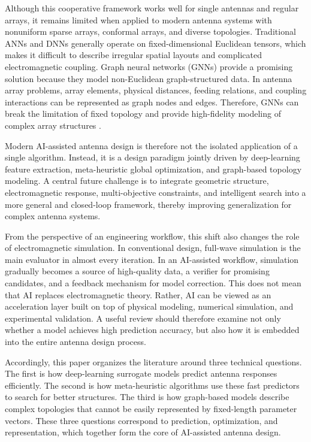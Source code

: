 \documentclass{article}
\begin{document}
Although this cooperative framework works well for single antennas and regular arrays, it remains limited when applied to modern antenna systems with nonuniform sparse arrays, conformal arrays, and diverse topologies. Traditional ANNs and DNNs generally operate on fixed-dimensional Euclidean tensors, which makes it difficult to describe irregular spatial layouts and complicated electromagnetic coupling. Graph neural networks (GNNs) provide a promising solution because they model non-Euclidean graph-structured data. In antenna array problems, array elements, physical distances, feeding relations, and coupling interactions can be represented as graph nodes and edges. Therefore, GNNs can break the limitation of fixed topology and provide high-fidelity modeling of complex array structures \cite{yang2024doa,wu2021gnn,yu2018stgcn,he2025fluid,xie2025pinching}.

Modern AI-assisted antenna design is therefore not the isolated application of a single algorithm. Instead, it is a design paradigm jointly driven by deep-learning feature extraction, meta-heuristic global optimization, and graph-based topology modeling. A central future challenge is to integrate geometric structure, electromagnetic response, multi-objective constraints, and intelligent search into a more general and closed-loop framework, thereby improving generalization for complex antenna systems.

From the perspective of an engineering workflow, this shift also changes the role of electromagnetic simulation. In conventional design, full-wave simulation is the main evaluator in almost every iteration. In an AI-assisted workflow, simulation gradually becomes a source of high-quality data, a verifier for promising candidates, and a feedback mechanism for model correction. This does not mean that AI replaces electromagnetic theory. Rather, AI can be viewed as an acceleration layer built on top of physical modeling, numerical simulation, and experimental validation. A useful review should therefore examine not only whether a model achieves high prediction accuracy, but also how it is embedded into the entire antenna design process.

Accordingly, this paper organizes the literature around three technical questions. The first is how deep-learning surrogate models predict antenna responses efficiently. The second is how meta-heuristic algorithms use these fast predictors to search for better structures. The third is how graph-based models describe complex topologies that cannot be easily represented by fixed-length parameter vectors. These three questions correspond to prediction, optimization, and representation, which together form the core of AI-assisted antenna design.
\end{document}
